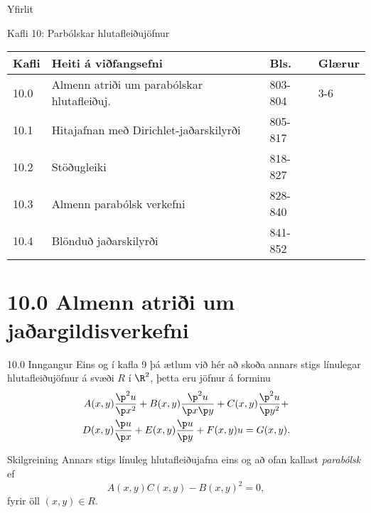\date{13.~og 18.~apríl, 2014}



\begin{frame}
	\maketitle
\end{frame}

\begin{frame}{Yfirlit}
\begin{block}{Kafli 10: Parbólskar hlutafleiðujöfnur}
\begin{center}
\begin{tabular}{|l|l|l|l|}\hline
Kafli &Heiti á viðfangsefni & Bls. & Glærur\\
\hline
10.0 & Almenn atriði um parabólskar hlutafleiðuj. & 803-804 & 3-6\\
10.1 & Hitajafnan með Dirichlet-jaðarskilyrði & 805-817 & \\
10.2 & Stöðugleiki & 818-827 & \\
10.3 & Almenn parabólsk verkefni & 828-840 & \\
10.4 & Blönduð jaðarskilyrði & 841-852 & \\ \hline
\end{tabular}
\end{center}
\end{block}
\end{frame}

\section*{10.0 Almenn atriði um jaðargildisverkefni}

\begin{frame}{10.0 Inngangur}
Eins og í kafla 9 þá ætlum við hér að skoða annars stigs línulegar 
hlutafleiðujöfnur á svæði $R$ í $\R^2$, \pause þetta eru jöfnur á forminu
\begin{multline}
A(x,y)\frac{\p^2 u}{\p x^2} + B(x,y)\frac{\p^2 u}{\p x\p y} + C(x,y)\frac{\p^2 u}{\p y^2} +\\
D(x,y)\frac{\p u}{\p x} + E(x,y)\frac{\p u}{\p y} + F(x,y)u = G(x,y).
\end{multline}
\begin{block}{Skilgreining}
 Annars stigs línuleg hlutafleiðujafna eins og að ofan kallast \emph{parabólsk}
 ef 
 $$
  A(x,y)C(x,y) - B(x,y)^2 = 0,
 $$
 fyrir öll $(x,y) \in R$.
\end{block}

\end{frame}


